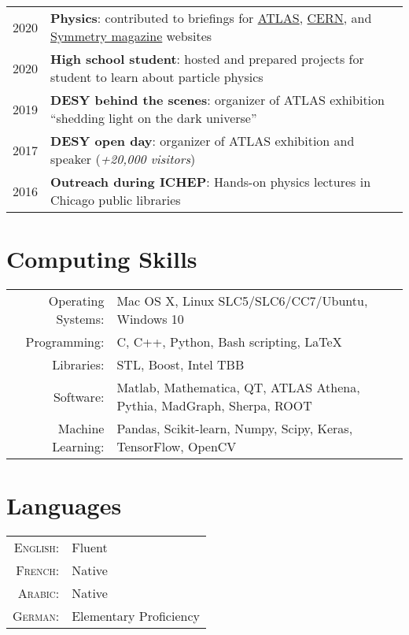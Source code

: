 \documentclass[a4paper,10pt]{article}
\begin{document}
\begin{tabular}{rp{15.5cm}}
\textsc{2020}		& {\bf Physics}: contributed to briefings for \href{http://atlas.cern/updates/physics-briefing/probing-dark-matter-higgs-boson}{ATLAS}, \href{https://home.cern/news/news/physics/atlas-probes-dark-matter-using-higgs-boson}{CERN},
and \href{https://www.symmetrymagazine.org/article/the-invisible-higgs-bosons}{Symmetry magazine} websites\\
\textsc{2020}		& {\bf High school student}: hosted and prepared projects for student to learn about particle physics\\
\textsc{2019}		& {\bf DESY behind the scenes}: organizer of ATLAS exhibition ``shedding light on the dark universe'' \\
\textsc{2017}		& {\bf DESY open day}: organizer of ATLAS exhibition and speaker ({\it +20,000 visitors})\\
\textsc{2016}		& {\bf Outreach during ICHEP}: Hands-on physics lectures in Chicago public libraries \\
\end{tabular}



\vspace{3mm}
\section{Computing Skills}
\begin{tabular}{rl}
Operating Systems:  & Mac OS X, Linux SLC5/SLC6/CC7/Ubuntu, Windows 10  \\
Programming:    & C, C++, Python, Bash scripting, \LaTeX        \\
Libraries:          & STL, Boost, Intel TBB \\
Software:           & Matlab, Mathematica, QT, ATLAS Athena, Pythia, MadGraph, Sherpa, ROOT   \\
Machine Learning:   & Pandas, Scikit-learn, Numpy, Scipy, Keras, TensorFlow, OpenCV     \\
\end{tabular}


\vspace{3mm}
\section{Languages}

\begin{tabular}{rl}
\textsc{English:}	& Fluent					\\
\textsc{French:}	& Native	\\
\textsc{Arabic:}	& Native    \\
\textsc{German:}	& Elementary Proficiency		\\
\end{tabular}
\end{document}
